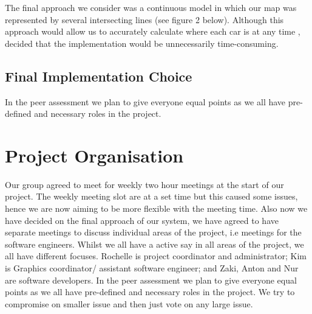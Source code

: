 \documentclass[11pt]{article}
\begin{document}
	The final approach we consider was a continuous model in which our map was represented by several intersecting lines (see figure 2 below). Although this approach would allow us to accurately calculate where each car is at any time , decided that the implementation would be unnecessarily time-consuming.  
	
	\FloatBarrier

\subsection{Final Implementation Choice}
	In the peer assessment we plan to give everyone equal points as we all have pre-defined and necessary roles in the project.
	
	
	
	
	\section{Project Organisation}
	
	Our group agreed to meet for weekly two hour meetings at the start of our project. The weekly meeting slot are at a set time but this caused some issues, hence we are now aiming to be more flexible with the meeting time. Also now we have decided on the final approach of our system, we have agreed to have separate meetings to discuss individual areas of the project, i.e meetings for the software engineers. Whilst we all have a active say in all areas of the project, we all have different focuses. Rochelle is project coordinator and administrator; Kim is Graphics coordinator/ assistant software engineer; and Zaki, Anton and Nur are software developers. In the peer assessment we plan to give everyone equal points as we all have pre-defined and necessary roles in the project. We try to compromise on smaller issue and then just vote on any large issue.  
	



	
\end{document}
